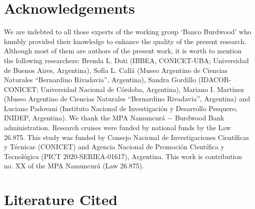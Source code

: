 \documentclass[preprint, 3p,
authoryear]{elsarticle} %
\begin{document}
\hypertarget{acknowledgements}{%
\section{Acknowledgements}\label{acknowledgements}}

We are indebted to all those experts of the working group `Banco
Burdwood' who humbly provided their knowledge to enhance the quality of
the present research. Although most of them are authors of the present
work, it is worth to mention the following researchers: Brenda L. Doti
(IBBEA, CONICET-UBA; Universidad de Buenos Aires, Argentina), Sofía L.
Callá (Museo Argentino de Ciencias Naturales ``Bernardino Rivadavia'',
Argentina), Sandra Gordillo (IDACOR-CONICET; Universidad Nacional de
Córdoba, Argentina), Mariano I. Martinez (Museo Argentino de Ciencias
Naturales ``Bernardino Rivadavia'', Argentina) and Luciano Padovani
(Instituto Nacional de Investigación y Desarrollo Pesquero, INIDEP,
Argentina). We thank the MPA Namuncurá − Burdwood Bank administration.
Research cruises were funded by national funds by the Law 26.875. This
study was funded by Consejo Nacional de Investigaciones Científicas y
Técnicas (CONICET) and Agencia Nacional de Promoción Científica y
Tecnológica (PICT 2020-SERIEA-01617), Argentina. This work is
contribution no. XX of the MPA Namuncurá (Law 26.875).

\hypertarget{literature-cited}{%
\section*{Literature Cited}\label{literature-cited}}
\end{document}
